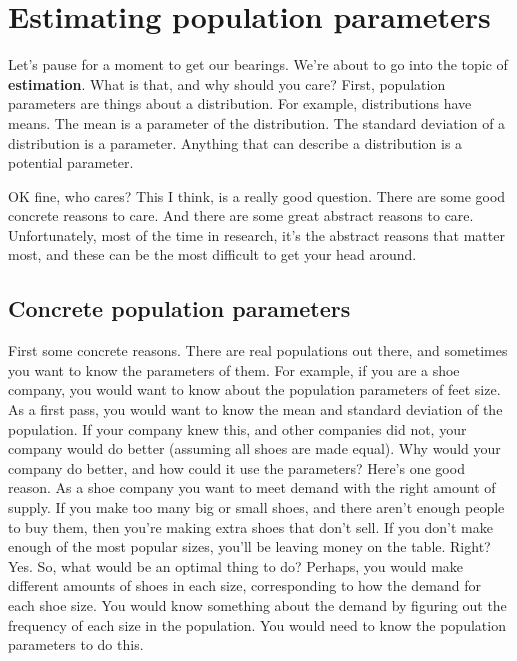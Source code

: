 \documentclass[
]{book}
\begin{document}
\hypertarget{estimating-population-parameters}{%
\section{Estimating population parameters}\label{estimating-population-parameters}}

Let's pause for a moment to get our bearings. We're about to go into the topic of \textbf{estimation}. What is that, and why should you care? First, population parameters are things about a distribution. For example, distributions have means. The mean is a parameter of the distribution. The standard deviation of a distribution is a parameter. Anything that can describe a distribution is a potential parameter.

OK fine, who cares? This I think, is a really good question. There are some good concrete reasons to care. And there are some great abstract reasons to care. Unfortunately, most of the time in research, it's the abstract reasons that matter most, and these can be the most difficult to get your head around.

\hypertarget{concrete-population-parameters}{%
\subsection{Concrete population parameters}\label{concrete-population-parameters}}

First some concrete reasons. There are real populations out there, and sometimes you want to know the parameters of them. For example, if you are a shoe company, you would want to know about the population parameters of feet size. As a first pass, you would want to know the mean and standard deviation of the population. If your company knew this, and other companies did not, your company would do better (assuming all shoes are made equal). Why would your company do better, and how could it use the parameters? Here's one good reason. As a shoe company you want to meet demand with the right amount of supply. If you make too many big or small shoes, and there aren't enough people to buy them, then you're making extra shoes that don't sell. If you don't make enough of the most popular sizes, you'll be leaving money on the table. Right? Yes. So, what would be an optimal thing to do? Perhaps, you would make different amounts of shoes in each size, corresponding to how the demand for each shoe size. You would know something about the demand by figuring out the frequency of each size in the population. You would need to know the population parameters to do this.
\end{document}
